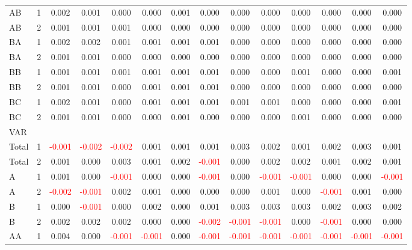 \begin{table}[H]
{\begin{tabular}{llcccccccccccc}
AB & 1 & 0.002 & 0.001 & 0.000 & 0.000 & 0.001 & 0.000 & 0.000 & 0.000 & 0.000 & 0.000 & 0.000 & 0.000\\
AB & 2 & 0.001 & 0.001 & 0.001 & 0.000 & 0.000 & 0.000 & 0.000 & 0.000 & 0.000 & 0.000 & 0.000 & 0.000\\
BA & 1 & 0.002 & 0.002 & 0.001 & 0.001 & 0.001 & 0.001 & 0.000 & 0.000 & 0.000 & 0.000 & 0.000 & 0.000\\
BA & 2 & 0.001 & 0.001 & 0.000 & 0.000 & 0.000 & 0.000 & 0.000 & 0.000 & 0.000 & 0.000 & 0.000 & 0.000\\
BB & 1 & 0.001 & 0.001 & 0.001 & 0.001 & 0.001 & 0.001 & 0.000 & 0.000 & 0.001 & 0.000 & 0.000 & 0.001\\
BB & 2 & 0.001 & 0.001 & 0.000 & 0.001 & 0.001 & 0.001 & 0.000 & 0.000 & 0.000 & 0.000 & 0.000 & 0.000\\
BC & 1 & 0.002 & 0.001 & 0.000 & 0.001 & 0.001 & 0.001 & 0.001 & 0.001 & 0.000 & 0.000 & 0.000 & 0.001\\
BC & 2 & 0.001 & 0.001 & 0.000 & 0.000 & 0.001 & 0.000 & 0.000 & 0.000 & 0.001 & 0.000 & 0.000 & 0.000\\
\hline
VAR &  &  &  &  &  &  &  &  &  &  &  &  & \\
\hline
Total & 1 & \textcolor{red}{-0.001} & \textcolor{red}{-0.002} & \textcolor{red}{-0.002} & 0.001 & 0.001 & 0.001 & 0.003 & 0.002 & 0.001 & 0.002 & 0.003 & 0.001\\
Total & 2 & 0.001 & 0.000 & 0.003 & 0.001 & 0.002 & \textcolor{red}{-0.001} & 0.000 & 0.002 & 0.002 & 0.001 & 0.002 & 0.001\\
A & 1 & 0.001 & 0.000 & \textcolor{red}{-0.001} & 0.000 & 0.000 & \textcolor{red}{-0.001} & 0.000 & \textcolor{red}{-0.001} & \textcolor{red}{-0.001} & 0.000 & 0.000 & \textcolor{red}{-0.001}\\
A & 2 & \textcolor{red}{-0.002} & \textcolor{red}{-0.001} & 0.002 & 0.001 & 0.000 & 0.000 & 0.000 & 0.001 & 0.000 & \textcolor{red}{-0.001} & 0.001 & 0.000\\
B & 1 & 0.000 & \textcolor{red}{-0.001} & 0.000 & 0.002 & 0.000 & 0.001 & 0.003 & 0.003 & 0.003 & 0.002 & 0.003 & 0.002\\
B & 2 & 0.002 & 0.002 & 0.002 & 0.000 & 0.000 & \textcolor{red}{-0.002} & \textcolor{red}{-0.001} & \textcolor{red}{-0.001} & 0.000 & \textcolor{red}{-0.001} & 0.000 & 0.000\\
AA & 1 & 0.004 & 0.000 & \textcolor{red}{-0.001} & \textcolor{red}{-0.001} & 0.000 & \textcolor{red}{-0.001} & \textcolor{red}{-0.001} & \textcolor{red}{-0.001} & \textcolor{red}{-0.001} & \textcolor{red}{-0.001} & \textcolor{red}{-0.001} & \textcolor{red}{-0.001}\\

\end{tabular}}
\end{table}
